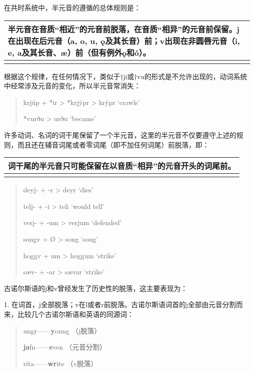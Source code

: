 在共时系统中，半元音的遵循的总体规则是：

\begin{longtable}{l}
  \toprule
  半元音在音质``相近''的元音前脱落，在音质``相异''的元音前保留。j在出现在后元音（a, o, u, ǫ及其长音）前；v出现在非圆唇元音（i, e, a及其长音、æ）前（但有例外ǫ和ó）。 \\
  \midrule
  \endhead
  \bottomrule
  \endfoot
\end{longtable}

根据这个规律，在任何情况下，类似于†ji或†vu的形式是不允许出现的，动词系统中经常涉及元音的变化，所以半元音常消失：

\begin{quote}
  krjúp + *ir \textgreater{} *krjýpr \textgreater{} krýpr `crawls'

  *vurðu \textgreater{} urðu `became'
\end{quote}

许多动词、名词的词干尾保留了一个半元音，这里的半元音不仅要遵守上述的规则，而且还在辅音词尾或者零词尾（即不加任何词尾）前脱落，即：

\begin{longtable}{l}
  \toprule
  词干尾的半元音只可能保留在以音质``相异''的元音开头的词尾前。 \\
  \midrule
  \endhead
  \bottomrule
  \endfoot
\end{longtable}

\begin{quote}
  deyj- + -r \textgreater{} deyr `dies'

  telj- + -i \textgreater{} teli `would tell'

  verj- + -um \textgreater{} verjum `defended'

  songv + Ø \textgreater{} song `song'

  hoggv + um \textgreater{} hoggum `strike'

  sæv- + -ar \textgreater{} sævar `strike'
\end{quote}

古诺尔斯语的j和v曾经发生了历史性的脱落，这主要表现为：

1.
在词首，j全部脱落；v在l或者r前脱落。古诺尔斯语词首的j全部由元音分割而来，比较几个古诺尔斯语和英语的同源词：

\begin{quote}
  ungr------\textbf{y}oung （j脱落）

  \textbf{ja}fn------\textbf{e}ven （元音分割）

  ríta------\textbf{wr}ite （v脱落）
\end{quote}

